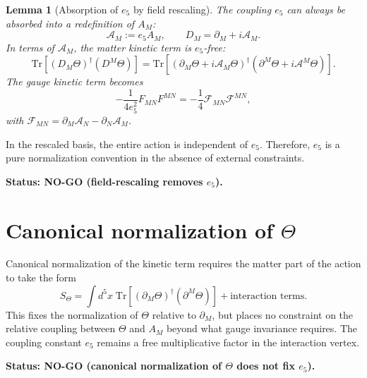 \documentclass[11pt,a4paper]{article}
\newtheorem{lemma}[proposition]{Lemma}
\begin{document}
\begin{lemma}[Absorption of $e_5$ by field rescaling]
The coupling $e_5$ can always be absorbed into a redefinition of $A_M$:
\begin{equation}
  \mathcal{A}_M := e_5 A_M,
  \qquad
  D_M = \partial_M + i\mathcal{A}_M.
\end{equation}
In terms of $\mathcal{A}_M$, the matter kinetic term is $e_5$-free:
\begin{equation}
  \mathrm{Tr}[(D_M\Theta)^\dagger(D^M\Theta)]
  =\mathrm{Tr}\!\left[(\partial_M\Theta+i\mathcal{A}_M\Theta)^\dagger
    (\partial^M\Theta+i\mathcal{A}^M\Theta)\right].
\end{equation}
The gauge kinetic term becomes
\begin{equation}
  -\frac{1}{4e_5^2}F_{MN}F^{MN}
  =-\frac{1}{4}\mathcal{F}_{MN}\mathcal{F}^{MN},
\end{equation}
with $\mathcal{F}_{MN}=\partial_M\mathcal{A}_N-\partial_N\mathcal{A}_M$.
\end{lemma}

In the rescaled basis, the entire action is independent of $e_5$.  Therefore,
$e_5$ is a pure normalization convention in the absence of external constraints.

\textbf{Status: NO-GO (field-rescaling removes $e_5$).}

\section{Canonical normalization of $\Theta$}

Canonical normalization of the kinetic term requires the matter part of the
action to take the form
\begin{equation}
  S_\Theta = \int d^5x\;\mathrm{Tr}\!\left[(\partial_M\Theta)^\dagger(\partial^M\Theta)\right]
  + \text{interaction terms}.
\end{equation}
This fixes the normalization of $\Theta$ relative to $\partial_M$, but places
no constraint on the relative coupling between $\Theta$ and $A_M$ beyond what
gauge invariance requires.  The coupling constant $e_5$ remains a free
multiplicative factor in the interaction vertex.

\textbf{Status: NO-GO (canonical normalization of $\Theta$ does not fix $e_5$).}

\end{document}
